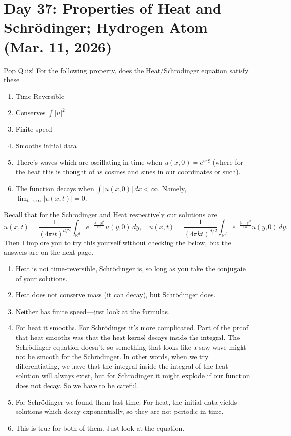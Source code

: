 \section{Day 37: Properties of Heat and Schr\"odinger; Hydrogen Atom (Mar. 11, 2026)}
Pop Quiz! For the following property, does the Heat/Schr\"odinger equation satisfy these
\begin{enumerate}

	\item Time Reversible
	\item Conserves \( \int |u|^{2} \)
	\item Finite speed
	\item Smooths initial data
	\item There's waves which are oscillating in time when \( u(x, 0) = e^{ix \xi} \) (where for the heat this is thought of as cosines and sines in our coordinates or such).
	\item The function decays when \( \int |u(x, 0)| \, dx < \infty \). Namely, \( \lim_{t \to \infty} |u(x, t)| = 0 \).

\end{enumerate}

Recall that for the Schr\"odinger and Heat respectively our solutions are
\[ u(x, t) = \frac{1}{\left( 4 \pi i t \right)^{d/2}} \int_{\mathbb{R}^{d}} e^{- \frac{|x - y|^{2}}{4 i t}} u(y, 0)\, dy, \quad u(x, t) = \frac{1}{\left( 4 \pi k t \right)^{d/2}} \int_{\mathbb{R}^{d}} e^{- \frac{|x - y|^{2}}{4 k t}} u(y, 0)\, dy. \]
Then I implore you to try this yourself without checking the below, but the answers are on the next page.
\pagebreak
\begin{enumerate}

	\item Heat is not time-reversible, Schr\"odinger is, so long as you take the conjugate of your solutions.
	\item Heat does not conserve mass (it can decay), but Schr\"odinger does.
	\item Neither has finite speed---just look at the formulas.
	\item For heat it smooths. For Schr\"odinger it's more complicated. Part of the proof that heat smooths was that the heat kernel decays inside the integral. The Schr\"odinger equation doesn't, so something that looks like a saw wave might not be smooth for the Schr\"odinger. In other words, when we try differentiating, we have that the integral inside the integral of the heat solution will always exist, but for Schr\"odinger it might explode if our function does not decay. So we have to be careful.
	\item For Schr\"odinger we found them last time. For heat, the initial data yields solutions which decay exponentially, so they are not periodic in time.
	\item This is true for both of them. Just look at the equation.

\end{enumerate}

